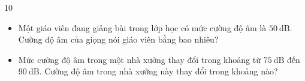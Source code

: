 \begin{indapan}{10}
\begin{bt}
\begin{itemize}
		\item[a)] Một giáo viên đang giảng bài trong lớp học có mức cường độ âm là $50 \mathrm{~dB}$. Cường độ âm của giọng nói giáo viên bằng bao nhiêu?
		\item[b)] Mức cường độ âm trong một nhà xưởng thay đổi trong khoảng từ $75 \mathrm{~dB}$ đến $90 \mathrm{~dB}$. Cường độ âm trong nhà xưởng này thay đổi trong khoảng nào?
	\end{itemize}
\end{bt}

\end{indapan}
